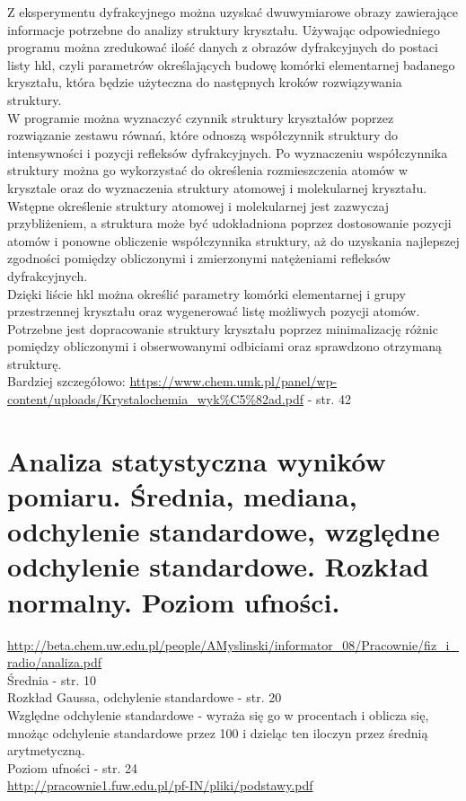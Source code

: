 \documentclass{article}
\begin{document}
\noindent Z eksperymentu dyfrakcyjnego można uzyskać dwuwymiarowe obrazy zawierające informacje potrzebne do analizy struktury kryształu. Używając odpowiedniego programu można zredukować ilość danych z obrazów dyfrakcyjnych do postaci listy hkl, czyli parametrów określających budowę komórki elementarnej badanego kryształu, która będzie użyteczna do następnych kroków rozwiązywania struktury. \\
\noindent W programie można wyznaczyć czynnik struktury kryształów poprzez rozwiązanie zestawu równań, które odnoszą współczynnik struktury do intensywności i pozycji refleksów dyfrakcyjnych. Po wyznaczeniu współczynnika struktury można go wykorzystać do określenia rozmieszczenia atomów w krysztale oraz do wyznaczenia struktury atomowej i molekularnej kryształu. Wstępne określenie struktury atomowej i molekularnej jest zazwyczaj przybliżeniem, a struktura może być udokładniona poprzez dostosowanie pozycji atomów i ponowne obliczenie współczynnika struktury, aż do uzyskania najlepszej zgodności pomiędzy obliczonymi i zmierzonymi natężeniami refleksów dyfrakcyjnych. \\

\noindent Dzięki liście hkl można określić parametry komórki elementarnej i grupy przestrzennej kryształu oraz wygenerować listę możliwych pozycji atomów. Potrzebne jest dopracowanie struktury kryształu poprzez minimalizację różnic pomiędzy obliczonymi i obserwowanymi odbiciami oraz sprawdzono otrzymaną strukturę. \\

\noindent Bardziej szczegółowo: \url{https://www.chem.umk.pl/panel/wp-content/uploads/Krystalochemia_wyk%C5%82ad.pdf} - str. 42

\section{Analiza statystyczna wyników pomiaru. Średnia, mediana, odchylenie standardowe, względne odchylenie standardowe. Rozkład normalny. Poziom ufności.}
\url{http://beta.chem.uw.edu.pl/people/AMyslinski/informator_08/Pracownie/fiz_i_radio/analiza.pdf}\\
\noindent Średnia - str. 10 \\
\noindent Rozkład Gaussa, odchylenie standardowe - str. 20 \\
\noindent Względne odchylenie standardowe - wyraża się go w procentach i oblicza się, mnożąc odchylenie standardowe przez 100 i dzieląc ten iloczyn przez średnią arytmetyczną. \\
\noindent Poziom ufności - str. 24 \\
\url{http://pracownie1.fuw.edu.pl/pf-IN/pliki/podstawy.pdf}
\end{document}
